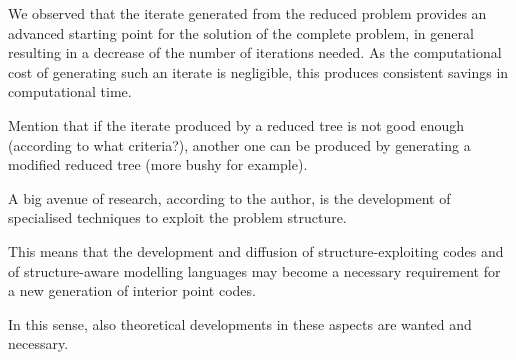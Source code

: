 We observed that the iterate generated from the reduced problem
provides an advanced starting point for the solution of the complete problem,
in general resulting in a decrease of the number of iterations needed.
As the computational cost of generating such an iterate is negligible,
this produces consistent savings in computational time.

Mention that if the iterate produced by a reduced tree 
is not good enough (according to what criteria?), another one 
can be produced by generating a modified reduced tree (more 
bushy for example).

A big avenue of research, according to the author, is the development
of specialised techniques to exploit the problem structure.

This means that the development and diffusion of structure-exploiting
codes and of structure-aware modelling languages may become a necessary
requirement for a new generation of interior point codes.

In this sense, also theoretical developments in these aspects are 
wanted and necessary.
